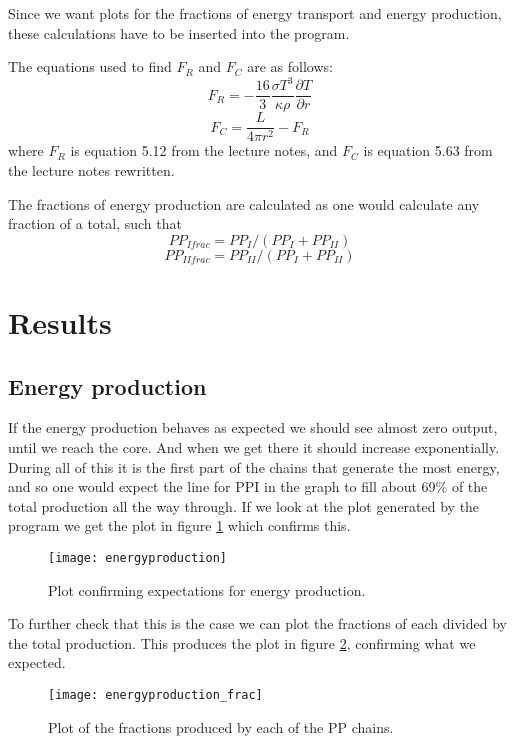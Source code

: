 \documentclass[a4paper,12pt]{article}
\begin{document}
Since we want plots for the fractions of energy transport and energy production, these calculations have to be inserted into the program.

The equations used to find $F_R$ and $F_C$ are as follows:
\begin{equation}
F_R = -\frac{16}{3}\frac{\sigma T^3}{\kappa \rho}\frac{\partial T}{\partial r}
\end{equation}
\begin{equation}
F_C = \frac{L}{4\pi r^2}-F_R
\end{equation}
where $F_R$ is equation 5.12 from the lecture notes, and $F_C$ is equation 5.63 from the lecture notes rewritten.

The fractions of energy production are calculated as one would calculate any fraction of a total, such that
\begin{equation}
PP_{Ifrac} = PP_I/(PP_I + PP_{II})
\end{equation}
\begin{equation}
PP_{IIfrac} = PP_{II}/(PP_I + PP_{II})
\end{equation}
\section{Results}
\subsection{Energy production}
If the energy production behaves as expected we should see almost zero output, until we reach the core. And when we get there it should increase exponentially. During all of this it is the first part of the chains that generate the most energy, and so one would expect the line for PPI in the graph to fill about 69\% of the total production all the way through. If we look at the plot generated by the program we get the plot in figure \ref{fig:Energy pruduction} which confirms this. 
\begin{figure}[H]
\texttt{[image: energyproduction]}
\caption{Plot confirming expectations for energy production.}
\label{fig:Energy pruduction}
\end{figure}
To further check that this is the case we can plot the fractions of each divided by the total production. This produces the plot in figure \ref{fig:energyproduction_frac}, confirming what we expected. 
\begin{figure}[H]
	\texttt{[image: energyproduction\_frac]}
	\caption{Plot of the fractions produced by each of the PP chains.}
	\label{fig:energyproduction_frac}
\end{figure}
\end{document}
